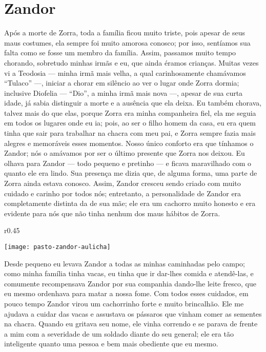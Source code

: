 \cleardoublepage
\newpage
\ifdefined\EnableIncludeImages
\fi
\chapter{Zandor}

Após a morte de Zorra, toda a família ficou muito triste, pois apesar de seus maus costumes, ela sempre foi muito amorosa conosco; por isso, sentíamos sua falta como se fosse um membro da família. 
Assim, passamos muito tempo chorando, sobretudo minhas irmãs e eu, que ainda éramos crianças. 
Muitas vezes vi a Teodosia ---  minha irmã mais velha, a qual carinhosamente chamávamos ``Tulaco'' ---, iniciar a chorar em silêncio ao ver o lugar onde Zorra dormia; inclusive Diofelia  --- ``Dio'', a minha irmã mais nova ---, apesar de sua curta idade, já sabia distinguir a morte e a ausência que ela deixa. 
Eu também chorava, talvez mais do que elas, porque Zorra era minha companheira fiel, ela me seguia em todos os lugares onde eu ia; pois, ao ser o filho homem da casa, eu era quem tinha que sair para trabalhar na chacra com meu pai, e Zorra sempre fazia mais alegres e memoráveis esses momentos.
Nosso único conforto era que tínhamos o Zandor; nós o amávamos por ser o último presente que Zorra nos deixou.
Eu olhava para Zandor --- todo pequeno e pretinho --- e ficava maravilhado com o quanto ele era lindo. Sua presença me dizia que, de alguma forma, uma parte de Zorra ainda estava conosco. 
Assim, Zandor cresceu sendo criado com muito cuidado e carinho por todos nós;
entretanto, a personalidade de Zandor era completamente distinta da de sua mãe; ele era um cachorro muito honesto e era evidente para nós que não tinha nenhum dos maus hábitos de Zorra. 
\ifdefined\EnableIncludeImages
\begin{wrapfigure}{r}{0.45\textwidth}
  \begin{center}
  \vspace{-20pt}
    \texttt{[image: pasto-zandor-aulicha]}
  \end{center}
  \vspace{-20pt}
\end{wrapfigure}
\fi
Desde pequeno eu levava Zandor a todas as minhas caminhadas pelo campo; como minha família tinha vacas, eu tinha que ir dar-lhes comida e atendê-las, e comumente recompensava Zandor por sua companhia dando-lhe leite fresco, que eu mesmo ordenhava para matar a nossa fome. 
Com todos esses cuidados, em pouco tempo Zandor virou um cachorrinho forte e muito brincalhão.
Ele me ajudava a cuidar das vacas e assustava os pássaros que vinham comer as sementes na chacra. Quando eu gritava seu nome, ele vinha correndo e se parava de frente a mim com a severidade de um soldado diante do seu general; ele era tão inteligente quanto uma pessoa e bem mais obediente que eu mesmo.

